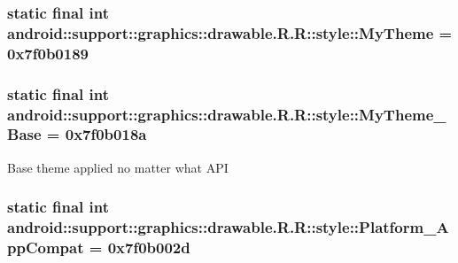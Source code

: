 \hypertarget{classandroid_1_1support_1_1graphics_1_1drawable_1_1_r_1_1style_9b2a832ac2b1cec7466567613a22274c}{
\subsubsection[{MyTheme}]{\setlength{\rightskip}{0pt plus 5cm}static final int android::support::graphics::drawable.R.R::style::MyTheme = 0x7f0b0189}}
\label{classandroid_1_1support_1_1graphics_1_1drawable_1_1_r_1_1style_9b2a832ac2b1cec7466567613a22274c}


\hypertarget{classandroid_1_1support_1_1graphics_1_1drawable_1_1_r_1_1style_62f623fc4382c26339728dd6e01855d0}{
\subsubsection[{MyTheme\_\-Base}]{\setlength{\rightskip}{0pt plus 5cm}static final int android::support::graphics::drawable.R.R::style::MyTheme\_\-Base = 0x7f0b018a}}
\label{classandroid_1_1support_1_1graphics_1_1drawable_1_1_r_1_1style_62f623fc4382c26339728dd6e01855d0}


Base theme applied no matter what API \hypertarget{classandroid_1_1support_1_1graphics_1_1drawable_1_1_r_1_1style_dd07f409636874a9dc51faf9d0dba12d}{
\subsubsection[{Platform\_\-AppCompat}]{\setlength{\rightskip}{0pt plus 5cm}static final int android::support::graphics::drawable.R.R::style::Platform\_\-AppCompat = 0x7f0b002d}}
\label{classandroid_1_1support_1_1graphics_1_1drawable_1_1_r_1_1style_dd07f409636874a9dc51faf9d0dba12d}


